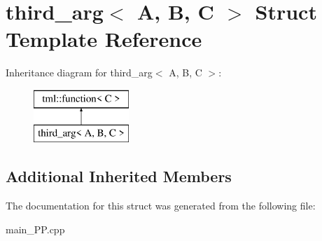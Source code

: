 \hypertarget{structthird__arg}{\section{third\+\_\+arg$<$ A, B, C $>$ Struct Template Reference}
\label{structthird__arg}
}
Inheritance diagram for third\+\_\+arg$<$ A, B, C $>$\+:\begin{figure}[H]
\begin{center}
\leavevmode
\includegraphics[height=2.000000cm]{structthird__arg}
\end{center}
\end{figure}
\subsection*{Additional Inherited Members}


The documentation for this struct was generated from the following file\+:\begin{DoxyCompactItemize}
\item 
main\+\_\+\+P\+P.\+cpp\end{DoxyCompactItemize}
